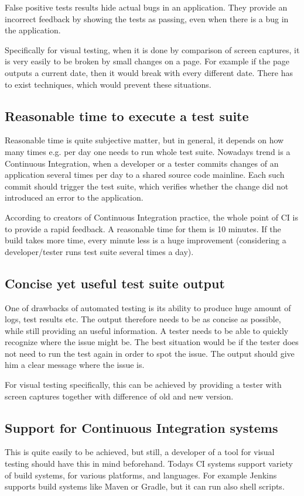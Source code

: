 \documentclass[11pt,oneside,final]{fithesis2}
\begin{document}
    False positive tests results hide actual bugs in an application. They provide an incorrect feedback by showing the tests as passing, even when there is a bug in the application.
    
    Specifically for visual testing, when it is done by comparison of screen captures, it is very easily to be broken by small changes on a page. For example if the page outputs a current
    date, then it would break with every different date. There has to exist techniques, which would prevent these situations.
    
    \subsection{Reasonable time to execute a test suite}
    Reasonable time is quite subjective matter, but in general, it depends on how many times e.g. per day one needs to run whole test suite. Nowadays trend is a Continuous Integration,
    when a developer or a tester commits changes of an application several times per day to a shared source code mainline. Each such commit should trigger the test suite, which verifies 
    whether the change did not introduced an error to the application.
    
    According to creators of Continuous Integration practice, the whole point of CI is to provide a rapid feedback. A reasonable time for them is 10 minutes. If the build
    takes more time, every minute less is a huge improvement (considering a developer/tester runs test suite several times a day).
    
    \subsection{Concise yet useful test suite output}
    One of drawbacks of automated testing is its ability to produce huge amount of logs, test results etc. The output therefore needs to be as concise as possible, while still providing
    an useful information. A tester needs to be able to quickly recognize where the issue might be. The best situation would be if the tester does not need to run the test again in order
    to spot the issue. The output should give him a clear message where the issue is.
    
    For visual testing specifically, this can be achieved by providing a tester with screen captures together with difference of old and new version.
    
    \subsection{Support for Continuous Integration systems}
    This is quite easily to be achieved, but still, a developer of a tool for visual testing should have this in mind beforehand. Todays CI systems support variety of build systems, for
    various platforms, and languages. For example Jenkins supports build systems like Maven or Gradle, but it can run also shell scripts.
    
\end{document}
